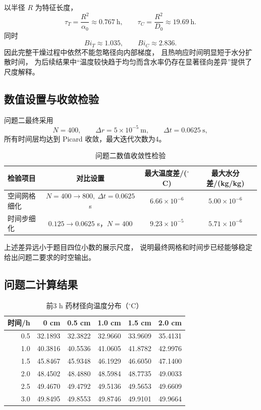 \documentclass[UTF8,a4paper,11pt]{ctexart}
\begin{document}
以半径 $R$ 为特征长度，
\[
\tau_T=\frac{R^2}{\alpha_0}\approx0.767~\mathrm h,
\qquad
\tau_C=\frac{R^2}{D_0}\approx19.69~\mathrm h.
\]
同时
\[
Bi_T\approx1.035,
\qquad
Bi_C\approx2.836.
\]
因此完整干燥过程中依然不能忽略径向内部梯度，
且热响应时间明显短于水分扩散时间，
为后续结果中“温度较快趋于均匀而含水率仍存在显著径向差异”提供了尺度解释。

\subsection{数值设置与收敛检验}

问题二最终采用
\[
N=400,\qquad
\Delta r=5\times10^{-5}~\mathrm m,
\qquad
\Delta t=0.0625~\mathrm s,
\]
所有时间层均达到 Picard 收敛，最大迭代次数为4。

\begin{table}[H]
\centering
\caption{问题二数值收敛性检验}
\begin{tabular}{lccc}
\toprule
检验项目 & 对比设置 & 最大温度差/($^\circ$C) & 最大水分差/(kg/kg)\\
\midrule
空间网格细化 &
$N=400\rightarrow800,\ \Delta t=0.0625$ s &
$6.66\times10^{-6}$ &
$5.00\times10^{-6}$\\
时间步细化 &
$0.125\rightarrow0.0625$ s，$N=400$ &
$9.23\times10^{-5}$ &
$5.71\times10^{-6}$\\
\bottomrule
\end{tabular}
\end{table}

上述差异远小于题目四位小数的展示尺度，
说明最终网格和时间步已经能够稳定给出问题二要求的时空输出。

\subsection{问题二计算结果}

\begin{table}[H]
\centering
\caption{前3 h 药材径向温度分布（$^\circ$C）}
\begin{tabular}{rrrrrr}
\toprule
时间/h & 0 cm & 0.5 cm & 1.0 cm & 1.5 cm & 2.0 cm\\
\midrule
0.5 & 32.1893 & 32.3822 & 32.9660 & 33.9609 & 35.4131\\
1.0 & 40.3816 & 40.5536 & 41.0605 & 41.8782 & 42.9976\\
1.5 & 45.8467 & 45.9348 & 46.1929 & 46.6050 & 47.1400\\
2.0 & 48.4502 & 48.4880 & 48.5984 & 48.7735 & 49.0033\\
2.5 & 49.4670 & 49.4792 & 49.5136 & 49.5653 & 49.6609\\
3.0 & 49.8495 & 49.8553 & 49.8746 & 49.9101 & 49.9664\\
\bottomrule
\end{tabular}
\end{table}
\end{document}
